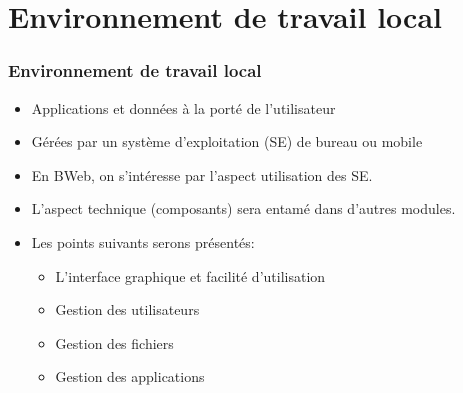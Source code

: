 \documentclass[xcolor=table]{beamer}
\begin{document}
\section{Environnement de travail local}

\begin{frame}
\frametitle{Environnement de travail local}

\begin{itemize}
	\item Applications et données à la porté de l'utilisateur 
	\item Gérées par un système d'exploitation (SE) de bureau ou mobile 
	\item En BWeb, on s'intéresse par l'aspect utilisation des SE. 
	\item L'aspect technique (composants) sera entamé dans d'autres modules. 
	\item Les points suivants serons présentés:
	\begin{itemize}
		\item L'interface graphique et facilité d'utilisation 
		\item Gestion des utilisateurs
		\item Gestion des fichiers
		\item Gestion des applications
	\end{itemize}
	
\end{itemize}

\end{frame}
\end{document}
